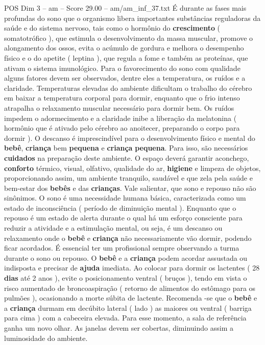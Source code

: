\begin{textsample}{POS Dim 3 – am – Score 29.00 – am/am\_inf\_37.txt}
É durante as fases mais profundas do sono que o organismo libera importantes substâncias reguladoras da saúde e do sistema nervoso, tais como o hormônio do \textbf{crescimento} ( somatotrófico ), que estimula o desenvolvimento da massa muscular, promove o alongamento dos ossos, evita o acúmulo de gordura e melhora o desempenho físico e o do apetite ( leptina ), que regula a fome e também as proteínas, que ativam o sistema imunológico.
Para o favorecimento do sono com qualidade alguns fatores devem ser observados, dentre eles a temperatura, os ruídos e a claridade.
Temperaturas elevadas do ambiente dificultam o trabalho do cérebro em baixar a temperatura corporal para dormir, enquanto que o frio intenso atrapalha o relaxamento muscular necessário para dormir bem.
Os ruídos impedem o adormecimento e a claridade inibe a liberação da melatonina ( hormônio que é ativado pelo cérebro ao anoitecer, preparando o corpo para dormir ).
O descanso é imprescindível para o desenvolvimento físico e mental do \textbf{bebê}, \textbf{criança} bem \textbf{pequena} e \textbf{criança} \textbf{pequena}.
Para isso, são necessários \textbf{cuidados} na preparação deste ambiente.
O espaço deverá garantir aconchego, \textbf{conforto} térmico, visual, olfativo, qualidade do ar, \textbf{higiene} e limpeza de objetos, proporcionando assim, um ambiente tranquilo, saudável e que zela pela saúde e bem-estar dos \textbf{bebês} e das \textbf{crianças}.
Vale salientar, que sono e repouso não são sinônimos.
O sono é uma necessidade humana básica, caracterizada como um estado de inconsciência ( período de diminuição mental ).
Enquanto que o repouso é um estado de alerta durante o qual há um esforço consciente para reduzir a atividade e a estimulação mental, ou seja, é um descanso ou relaxamento onde o \textbf{bebê} e \textbf{criança} não necessariamente vão dormir, podendo ficar acordados.
É essencial ter um profissional sempre observando a turma durante o sono ou repouso.
O \textbf{bebê} e a \textbf{criança} podem acordar assustada ou indisposta e precisar de \textbf{ajuda} imediata.
Ao colocar para dormir os lactentes ( 28 \textbf{dias} até 2 anos ), evite o posicionamento ventral ( bruços ), tendo em vista o risco aumentado de broncoaspiração ( retorno de alimentos do estômago para os pulmões ), ocasionando a morte súbita de lactente.
Recomenda -se que o \textbf{bebê} e a \textbf{criança} durmam em decúbito lateral ( lado ) as maiores ou ventral ( barriga para cima ) com a cabeceira elevada.
Para esse momento, a sala de referência ganha um novo olhar.
As janelas devem ser cobertas, diminuindo assim a luminosidade do ambiente.

\end{textsample}
